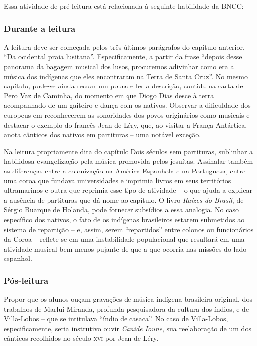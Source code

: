 \documentclass[11pt]{extarticle}
\begin{document}
Essa atividade de pré-leitura está relacionada à seguinte habilidade da BNCC:


\subsubsection{Durante a leitura}

  A leitura deve ser começada pelos três últimos parágrafos do capítulo
anterior, ``Da ocidental praia lusitana''. Especificamente, a partir da frase
“depois desse panorama da bagagem musical dos lusos, procuremos adivinhar como
era a música dos indígenas que eles encontraram na Terra de Santa Cruz”. No
mesmo capítulo, pode-se ainda recuar um pouco e ler a descrição, contida na
carta de Pero Vaz de Caminha, do momento em que Diogo Dias desce à terra
acompanhado de um gaiteiro e dança com os nativos. Observar a dificuldade dos
europeus em reconhecerem as sonoridades dos povos originários como musicais e
destacar o exemplo do francês Jean de Léry, que, ao visitar a França Antártica,
anota cânticos dos nativos em partituras – uma notável exceção.

Na leitura propriamente dita do capítulo Dois séculos sem
partituras, sublinhar a habilidosa evangelização pela música promovida pelos
jesuítas. Assinalar também as diferenças entre a colonização na América
Espanhola e na Portuguesa, entre uma coroa que fundava universidades e imprimia
livros em seus territórios ultramarinos e outra que reprimia esse tipo de
atividade – o que ajuda a explicar a ausência de partituras que dá nome ao
capítulo. O livro \emph{Raízes do Brasil}, de Sérgio Buarque de Holanda, pode fornecer
subsídios a essa analogia. No caso específico dos nativos, o fato de os
indígenas brasileiros estarem submetidos ao sistema de repartição – e, assim,
serem “repartidos” entre colonos ou funcionários da Coroa – reflete-se em uma
instabilidade populacional que resultará em uma atividade musical bem menos
pujante do que a que ocorria nas missões do lado espanhol. 

\subsubsection{Pós-leitura}


Propor que os alunos ouçam gravações de música indígena brasileira original,
dos trabalhos de Marlui Miranda, profunda pesquisadora da cultura dos índios, e
de Villa-Lobos – que se intitulava “índio de casaca”. No caso de Villa-Lobos,
especificamente, seria instrutivo ouvir \emph{Canide Ioune}, sua reelaboração de um
dos cânticos recolhidos no século \textsc{xvi} por Jean de Léry.
\end{document}
